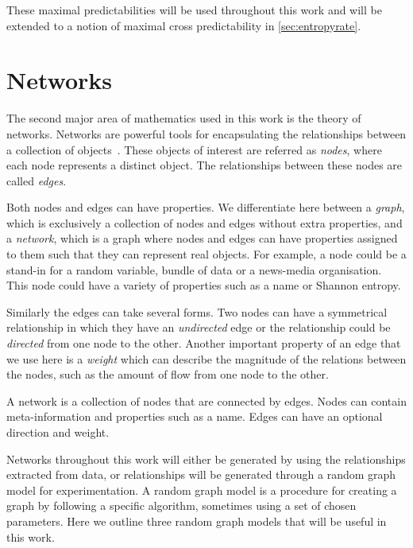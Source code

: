 These maximal predictabilities will be used throughout this work and will be extended to a notion of maximal cross predictability in \autoref{sec:entropyrate}.


\section{Networks}

The second major area of mathematics used in this work is the theory of networks. Networks are powerful tools for encapsulating the relationships between a collection of objects~\cite{newman_networks_2018}. These objects of interest are referred as \emph{nodes}, where each node represents a distinct object. The relationships between these nodes are called \emph{edges}.

Both nodes and edges can have properties.  We differentiate here between a \emph{graph}, which is exclusively a collection of nodes and edges without extra properties, and a \emph{network}, which is a graph where nodes and edges can have properties assigned to them such that they can represent real objects. For example, a node could be a stand-in for a random variable, bundle of data or a news-media organisation. This node could have a variety of properties such as a name or Shannon entropy.

Similarly the edges can take several forms. Two nodes can have a symmetrical relationship in which they have an \emph{undirected} edge or the relationship could be \emph{directed} from one node to the other. Another important property of an edge that we use here is a \emph{weight} which can describe the magnitude of the relations between the nodes, such as the amount of flow from one node to the other.

\begin{definition}
	A network is a collection of nodes that are connected by edges. Nodes can contain meta-information and properties such as a name. Edges can have an optional direction and weight.
\end{definition}

Networks throughout this work will either be generated by using the relationships extracted from data, or relationships will be generated through a random graph model for experimentation. A random graph model is a procedure for creating a graph by following a specific algorithm, sometimes using a set of chosen parameters.  Here we outline three random graph models that will be useful in this work.


